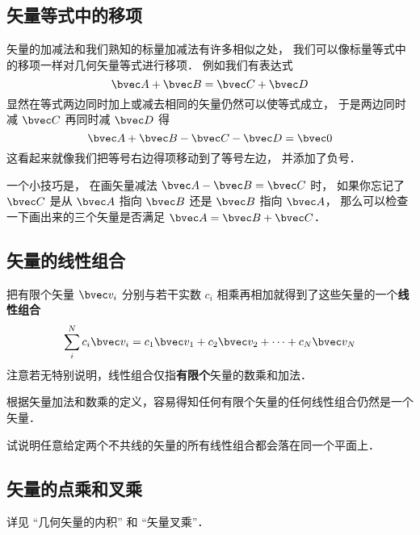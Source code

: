 \subsection{矢量等式中的移项}
矢量的加减法和我们熟知的标量加减法有许多相似之处， 我们可以像标量等式中的移项一样对几何矢量等式进行移项． 例如我们有表达式
\begin{equation}
\bvec A + \bvec B = \bvec C + \bvec D
\end{equation}
显然在等式两边同时加上或减去相同的矢量仍然可以使等式成立， 于是两边同时减 $\bvec C$ 再同时减 $\bvec D$ 得
\begin{equation}
\bvec A + \bvec B - \bvec C - \bvec D = \bvec 0
\end{equation}
这看起来就像我们把等号右边得项移动到了等号左边， 并添加了负号．

一个小技巧是， 在画矢量减法 $\bvec A - \bvec B = \bvec C$ 时， 如果你忘记了 $\bvec C$ 是从 $\bvec A$ 指向 $\bvec B$ 还是 $\bvec B$ 指向 $\bvec A$， 那么可以检查一下画出来的三个矢量是否满足 $\bvec A = \bvec B + \bvec C$．


\subsection{矢量的线性组合}
把有限个矢量 $\bvec v_i$ 分别与若干实数 $c_i$ 相乘再相加就得到了这些矢量的一个\textbf{线性组合}
\begin{equation}\label{GVecOp_eq1}
\sum_i^N c_i \bvec v_i = c_1\bvec v_1 + c_2\bvec v_2 +\dots +c_N \bvec v_N
\end{equation}
注意若无特别说明，线性组合仅指\textbf{有限个}矢量的数乘和加法．

根据矢量加法和数乘的定义，容易得知任何有限个矢量的任何线性组合仍然是一个矢量．

\begin{exercise}{}
试说明任意给定两个不共线的矢量的所有线性组合都会落在同一个平面上．
\end{exercise}

\subsection{矢量的点乘和叉乘}
详见 “几何矢量的内积” 和 “矢量叉乘”．
